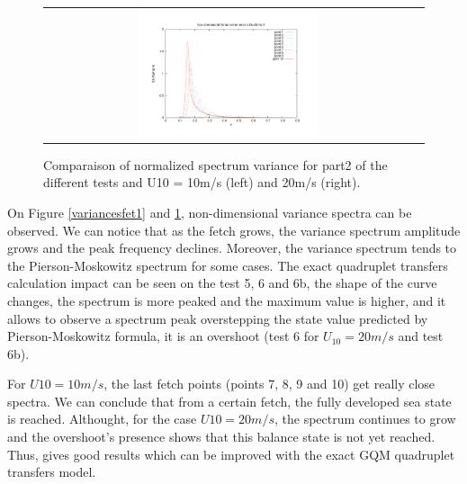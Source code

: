 \begin{figure}[h!]
\begin{tabular}{cc}
  \includegraphics[width=0.5\textwidth]{variance_ad_free_mesh_t6b_v20.pdf}\\
\end{tabular}
\caption{Comparaison of normalized spectrum variance for part2 of the different
  tests and U10 = 10m/s (left) and 20m/s (right).}
\label{variancesfet2}
\end{figure}
On Figure \ref{variancesfet1} and \ref{variancesfet2}, non-dimensional variance
spectra can be observed. We can notice that as the fetch grows, the variance
spectrum amplitude grows and the peak frequency declines. Moreover, the
variance spectrum tends to the Pierson-Moskowitz spectrum for some cases. The
exact quadruplet transfers calculation impact can be seen on the test 5, 6 and
6b, the shape of the curve changes, the spectrum is more peaked and the maximum
value is higher, and it allows to observe a spectrum peak overstepping the
state value predicted by Pierson-Moskowitz formula, it is an overshoot (test 6
for $U_{10} = 20m/s$ and test 6b).

For $U10 = 10m/s$, the last fetch points (points 7, 8, 9 and 10) get really
close spectra. We can conclude that from a certain fetch, the fully developed
sea state is reached. Althought, for the case $U10 = 20m/s$, the spectrum
continues to grow and the overshoot's presence shows that this balance state is
not yet reached. Thus, \tomawac gives good results which can be improved with
the exact GQM quadruplet transfers model.

